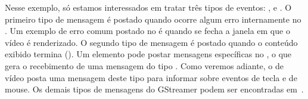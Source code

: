 Nesse exemplo, só estamos interessados em tratar três tipos de eventos:
,  e .
O primeiro tipo de mensagem é postado quando ocorre algum erro internamente
no . Um exemplo de erro comum postado no  é quando se
fecha a janela em que o vídeo é renderizado. O segundo tipo de mensagem é 
postado quando o conteúdo exibido termina (). Um elemento
pode postar mensagens específicas no , o que gera o recebimento de 
uma mensagem do tipo . Como veremos adiante,
o  de vídeo posta uma mensagem deste tipo para informar sobre eventos
de tecla e de mouse. Os demais tipos de mensagens do GStreamer podem ser
encontradas em~\cite{gstreamer}.
